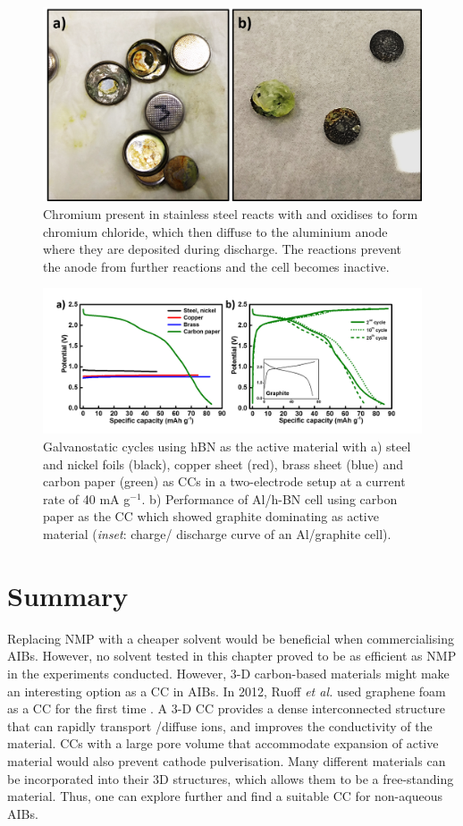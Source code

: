 \begin{figure}[tbh!]
\centering
\includegraphics[width=\textwidth]{Figures/chap7fig/steeleffect}
\caption{Chromium present in stainless steel reacts with  and oxidises to form chromium chloride, which then diffuse to the aluminium anode where they are deposited during discharge. The reactions prevent the anode from further reactions and the cell becomes inactive.}
\label{Figures/chap7fig:steeleffect}
\end{figure}
\begin{figure}[tbh!]
\centering
\includegraphics[width=\textwidth]{Figures/chap7fig/hBNCCCDC}
\caption{Galvanostatic cycles using hBN as the active material with a) steel and nickel foils (black), copper sheet (red), brass sheet (blue) and carbon paper (green) as CCs in a two-electrode setup at a current rate of 40 mA g$^{-1}$. b) Performance of Al/h-BN cell using carbon paper as the CC which showed graphite dominating as active material (\textit{inset}: charge/ discharge curve of an Al/graphite cell).}
\label{Figures/chap7fig:hBNCCCDC}
\end{figure}

\section{Summary}
Replacing NMP with a cheaper solvent would be beneficial when commercialising AIBs. However, no solvent tested in this chapter proved to be as efficient as NMP in the experiments conducted. However, 3-D carbon-based materials might make an interesting option as a CC in AIBs. In 2012, Ruoff \textit{et al.} used graphene foam as a CC for the first time \cite{ji_ultrathin_2012}. A 3-D CC provides a dense interconnected structure that can rapidly transport /diffuse ions, and improves the conductivity of the material. CCs with a large pore volume that accommodate expansion of active material would also prevent cathode pulverisation. Many different materials can be incorporated into their 3D structures, which allows them to be a free-standing material. Thus, one can explore further and find a suitable CC for non-aqueous AIBs.
\newpage

